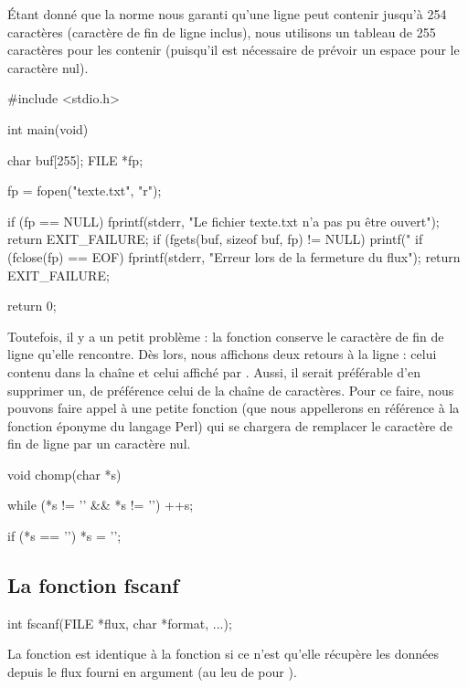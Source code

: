 \begin{infobox} 
 Étant donné que la norme nous garanti
qu'une ligne peut contenir jusqu'à 254 caractères (caractère de fin de
ligne inclus), nous utilisons un tableau de 255 caractères pour les
contenir (puisqu'il est nécessaire de prévoir un espace pour le
caractère nul).
\end{infobox}


\begin{C}
#include <stdio.h>

int main(void)
{
    char buf[255];
    FILE *fp;

    fp = fopen("texte.txt", "r");

    if (fp == NULL)
    {
        fprintf(stderr, "Le fichier texte.txt n'a pas pu être ouvert\n");
        return EXIT_FAILURE;
    }
    if (fgets(buf, sizeof buf, fp) != NULL)
        printf("%
    if (fclose(fp) == EOF)
    {
        fprintf(stderr, "Erreur lors de la fermeture du flux\n");
        return EXIT_FAILURE;        
    }

    return 0;
}
\end{C}

Toutefois, il y a un petit problème : la fonction 
conserve le caractère de fin de ligne qu'elle rencontre. Dès lors, nous
affichons deux retours à la ligne : celui contenu dans la chaîne
 et celui affiché par . Aussi, il serait
préférable d'en supprimer un, de préférence celui de la chaîne de
caractères. Pour ce faire, nous pouvons faire appel à une petite
fonction (que nous appellerons  en référence à la
fonction éponyme du langage Perl) qui se chargera de remplacer le
caractère de fin de ligne par un caractère nul.

\begin{C}
void chomp(char *s)
{
    while (*s != '\n' && *s != '\0')
        ++s;

    if (*s == '\n')
        *s = '\0';
}
\end{C}

\subsection{La fonction fscanf}
\label{la-fonction-fscanf}

\begin{C}
int fscanf(FILE *flux, char *format, ...);
\end{C}

La fonction  est identique à la fonction
 si ce n'est qu'elle récupère les données depuis le flux
fourni en argument (au leu de  pour ).

